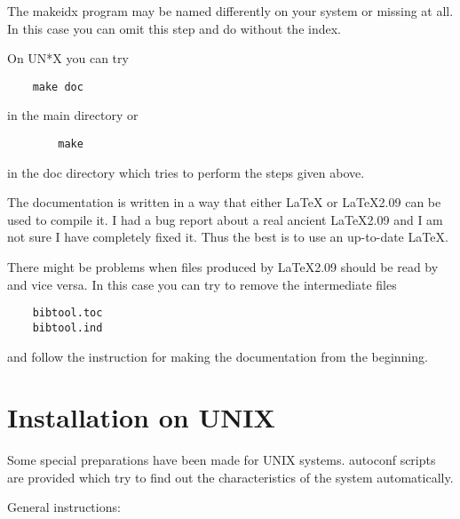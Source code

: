 \documentclass[11pt,a4paper]{scrartcl}
\newcommand\file[1]{\textsf{#1}}
\begin{document}
\begin{enumerate}
  The makeidx program may be named differently on your system or
  missing at all. In this case you can omit this step and do without
  the index.
  
  On UN*X you can try

\begin{verbatim}
	make doc
\end{verbatim}
  
  in the main directory or

\begin{verbatim}
        make
\end{verbatim}
  
  in the \file{doc} directory which tries to perform the steps given
  above.
  
  The documentation is written in a way that either \LaTeX{} or
  \LaTeX2.09 can be used to compile it. I had a bug report about a
  real ancient \LaTeX2.09 and I am not sure I have completely fixed
  it.  Thus the best is to use an up-to-date \LaTeX.
  
  There might be problems when files produced by \LaTeX2.09 should be
  read by \LaTeXe{} and vice versa.  In this case you can try to
  remove the intermediate files

\begin{verbatim}
	bibtool.toc
	bibtool.ind
\end{verbatim}
  
  and follow the instruction for making the documentation from the
  beginning.

\end{enumerate}


\section{Installation on UNIX}

Some special preparations have been made for UNIX systems.  autoconf scripts
are  provided which  try  to find  out the   characteristics  of  the system
automatically.

General instructions:
\end{document}
